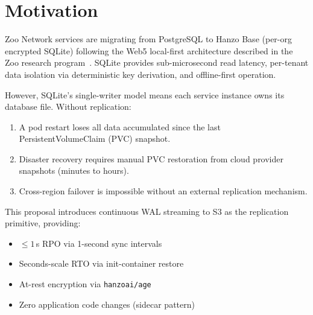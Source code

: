 \section{Motivation}


Zoo Network services are migrating from PostgreSQL to Hanzo Base
(per-org encrypted SQLite) following the Web5 local-first architecture
described in the Zoo research program~\cite{web5}.  SQLite provides
sub-microsecond read latency, per-tenant data isolation via
deterministic key derivation, and offline-first operation.

However, SQLite's single-writer model means each service instance
owns its database file.  Without replication:

\begin{enumerate}
\item A pod restart loses all data accumulated since the last
  PersistentVolumeClaim (PVC) snapshot.
\item Disaster recovery requires manual PVC restoration from
  cloud provider snapshots (minutes to hours).
\item Cross-region failover is impossible without an external
  replication mechanism.
\end{enumerate}

This proposal introduces continuous WAL streaming to S3 as the
replication primitive, providing:

\begin{itemize}
\item $\leq 1$\,s RPO via 1-second sync intervals
\item Seconds-scale RTO via init-container restore
\item At-rest encryption via \texttt{hanzoai/age}
\item Zero application code changes (sidecar pattern)
\end{itemize}

